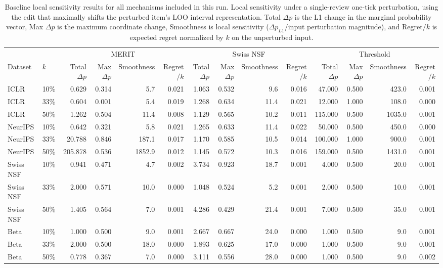 \begin{table}[t]
\centering
\small
\setlength{\tabcolsep}{4pt}
\begin{tabular}{ll|rrrr|rrrr|rrrr}
\toprule
 & & \multicolumn{4}{c}{MERIT} & \multicolumn{4}{c}{Swiss NSF} & \multicolumn{4}{c}{Threshold} \\
Dataset & $k$ & Total $\Delta p$ & Max $\Delta p$ & Smoothness & Regret$/k$ & Total $\Delta p$ & Max $\Delta p$ & Smoothness & Regret$/k$ & Total $\Delta p$ & Max $\Delta p$ & Smoothness & Regret$/k$ \\
\midrule
ICLR & 10\% & 0.629 & 0.314 & 5.7 & 0.021 & 1.063 & 0.532 & 9.6 & 0.016 & 47.000 & 0.500 & 423.0 & 0.001 \\
ICLR & 33\% & 0.604 & 0.001 & 5.4 & 0.019 & 1.268 & 0.634 & 11.4 & 0.021 & 12.000 & 1.000 & 108.0 & 0.000 \\
ICLR & 50\% & 1.262 & 0.504 & 11.4 & 0.008 & 1.129 & 0.565 & 10.2 & 0.011 & 115.000 & 0.500 & 1035.0 & 0.001 \\
\midrule
NeurIPS & 10\% & 0.642 & 0.321 & 5.8 & 0.021 & 1.265 & 0.633 & 11.4 & 0.022 & 50.000 & 0.500 & 450.0 & 0.000 \\
NeurIPS & 33\% & 20.788 & 0.846 & 187.1 & 0.017 & 1.170 & 0.585 & 10.5 & 0.014 & 100.000 & 1.000 & 900.0 & 0.001 \\
NeurIPS & 50\% & 205.878 & 0.536 & 1852.9 & 0.012 & 1.145 & 0.572 & 10.3 & 0.016 & 159.000 & 0.500 & 1431.0 & 0.001 \\
\midrule
Swiss NSF & 10\% & 0.941 & 0.471 & 4.7 & 0.002 & 3.734 & 0.923 & 18.7 & 0.001 & 4.000 & 0.500 & 20.0 & 0.001 \\
Swiss NSF & 33\% & 2.000 & 0.571 & 10.0 & 0.000 & 1.048 & 0.524 & 5.2 & 0.001 & 2.000 & 0.500 & 10.0 & 0.001 \\
Swiss NSF & 50\% & 1.405 & 0.564 & 7.0 & 0.001 & 4.286 & 0.429 & 21.4 & 0.001 & 7.000 & 0.500 & 35.0 & 0.001 \\
\midrule
Beta & 10\% & 1.000 & 0.500 & 9.0 & 0.001 & 2.667 & 0.667 & 24.0 & 0.000 & 1.000 & 0.500 & 9.0 & 0.001 \\
Beta & 33\% & 2.000 & 0.500 & 18.0 & 0.000 & 1.893 & 0.625 & 17.0 & 0.000 & 1.000 & 0.500 & 9.0 & 0.001 \\
Beta & 50\% & 0.778 & 0.367 & 7.0 & 0.000 & 3.111 & 0.556 & 28.0 & 0.000 & 1.000 & 0.500 & 9.0 & 0.002 \\
\bottomrule
\end{tabular}
\caption{Baseline local sensitivity results for all mechanisms included in this run. Local sensitivity under a single-review one-tick perturbation, using the edit that maximally shifts the perturbed item's LOO interval representation. Total $\Delta p$ is the L1 change in the marginal probability vector, Max $\Delta p$ is the maximum coordinate change, Smoothness is local sensitivity ($\Delta p_{L1}$/input perturbation magnitude), and Regret$/k$ is expected regret normalized by $k$ on the unperturbed input.}
\label{tab:baseline_local_sensitivity_existing}
\end{table}
